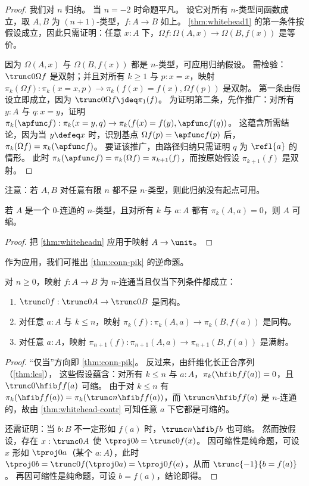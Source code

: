 \begin{proof}
  我们对 $n$ 归纳。
  当 $n=-2$ 时命题平凡。
  设它对所有 $n$-类型间函数成立，取 $A,B$ 为 $(n+1)$-类型，$f:A\to B$ 如上。
  \cref{thm:whitehead1} 的第一条件按假设成立，因此只需证明：任意 $x:A$ 下，$\Omega f: \Omega(A,x) \to \Omega(B,f(x))$ 是等价。

  因为 $\Omega(A,x)$ 与 $\Omega(B,f(x))$ 都是 $n$-类型，可应用归纳假设。
  需检验：$\trunc 0{\Omega f}$ 是双射；并且对所有 $k\geq1$ 与 $p : x = x$，映射 $\pi_k(\Omega f):\pi_k(x = x,p) \to \pi_k(f(x) = f(x),\Omega f(p))$ 是双射。
  第一条由假设立即成立，因为 $\trunc 0{\Omega f} \jdeq \pi_1(f)$。
  为证明第二条，先作推广：对所有 $y : A$ 与 $q : x = y$，证明 $\pi_k(\apfunc f):\pi_k(x = y,q) \to \pi_k(f(x) = f(y),\apfunc f(q))$。
  这蕴含所需结论，因为当 $y\defeq x$ 时，识别基点 $\Omega f(p)=\apfunc f(p)$ 后，$\pi_k(\Omega f)=\pi_k(\apfunc f)$。
  要证该推广，由路径归纳只需证明 $q$ 为 $\refl{a}$ 的情形。
  此时 $\pi_k(\apfunc f) = \pi_k(\Omega f) = \pi_{k+1}(f)$，而按原始假设 $\pi_{k+1}(f)$ 是双射。
\end{proof}

注意：若 $A,B$ 对任意有限 $n$ 都不是 $n$-类型，则此归纳没有起点可用。

\begin{cor}\label{thm:whitehead-contr}
  若 $A$ 是一个 0-连通的 $n$-类型，且对所有 $k$ 与 $a:A$ 都有 $\pi_k(A,a)=0$，则 $A$ 可缩。
\end{cor}
\begin{proof}
  把 \cref{thm:whiteheadn} 应用于映射 $A\to\unit$。
\end{proof}

作为应用，我们可推出 \cref{thm:conn-pik} 的逆命题。

\begin{cor}\label{thm:pik-conn}
  对 $n\ge 0$，映射 $f:A\to B$ 为 $n$-连通当且仅当下列条件都成立：
  \begin{enumerate}
  \item $\trunc0f:\trunc0A \to \trunc0B$ 是同构。
  \item 对任意 $a:A$ 与 $k\le n$，映射 $\pi_k(f):\pi_k(A,a) \to \pi_k(B,f(a))$ 是同构。
  \item 对任意 $a:A$，映射 $\pi_{n+1}(f):\pi_{n+1}(A,a) \to \pi_{n+1}(B,f(a))$ 是满射。
  \end{enumerate}
\end{cor}
\begin{proof}
  “仅当”方向即 \cref{thm:conn-pik}。
  反过来，由纤维化长正合序列（\cref{thm:les}），
  这些假设蕴含：对所有 $k\le n$ 与 $a:A$，$\pi_k(\hfib f {f(a)})=0$，且 $\trunc 0{\hfib f{f(a)}}$ 可缩。
  由于对 $k\le n$ 有 $\pi_k(\hfib f {f(a)}) = \pi_k(\trunc n{\hfib f{f(a)}})$，而 $\trunc n{\hfib f{f(a)}}$ 是 $n$-连通的，故由 \cref{thm:whitehead-contr} 可知任意 $a$ 下它都是可缩的。

  还需证明：当 $b:B$ 不一定形如 $f(a)$ 时，$\trunc n{\hfib f{b}}$ 也可缩。
  然而按假设，存在 $x:\trunc0A$ 使 $\tproj 0b = \trunc0f(x)$。
  因可缩性是纯命题，可设 $x$ 形如 $\tproj0a$（某个 $a:A$），此时 $\tproj 0 b = \trunc0f(\tproj0a) = \tproj0{f(a)}$，从而 $\trunc{-1}{b=f(a)}$。
  再因可缩性是纯命题，可设 $b=f(a)$，结论即得。
\end{proof}

